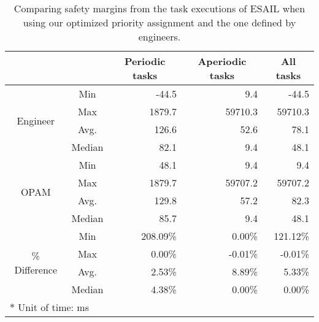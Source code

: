 \begin{table}[t]
\caption{Comparing safety margins from the task executions of ESAIL when using our optimized priority assignment and the one defined by engineers.}
	\begin{center}
	\begin{tabular}{ccrrr}
		\toprule
		\multicolumn{1}{l}{} & \multicolumn{1}{l}{} & \multicolumn{1}{c}{Periodic tasks} & \multicolumn{1}{c}{Aperiodic tasks} & \multicolumn{1}{c}{All tasks} \\
		\midrule
\multirow{4}{*}{Engineer} & Min& -44.5& 9.4& -44.5 \\
 & Max& 1879.7& 59710.3& 59710.3 \\
 & Avg.& 126.6& 52.6& 78.1 \\
 & Median& 82.1& 9.4& 48.1 \\
		\midrule
\multirow{4}{*}{OPAM} & Min& 48.1& 9.4& 9.4 \\
 & Max& 1879.7& 59707.2& 59707.2 \\
 & Avg.& 129.8& 57.2& 82.3 \\
 & Median& 85.7& 9.4& 48.1 \\
		\midrule
\multirow{4}{*}{\% Difference} & Min& 208.09\%& 0.00\%& 121.12\% \\
 & Max& 0.00\%& -0.01\%& -0.01\% \\
 & Avg.& 2.53\%& 8.89\%& 5.33\% \\
 & Median& 4.38\%& 0.00\%& 0.00\% \\
		\bottomrule
		\multicolumn{5}{l}{\footnotesize $\ast$ Unit of time: ms}
	\end{tabular}
	\end{center}
\end{table}
